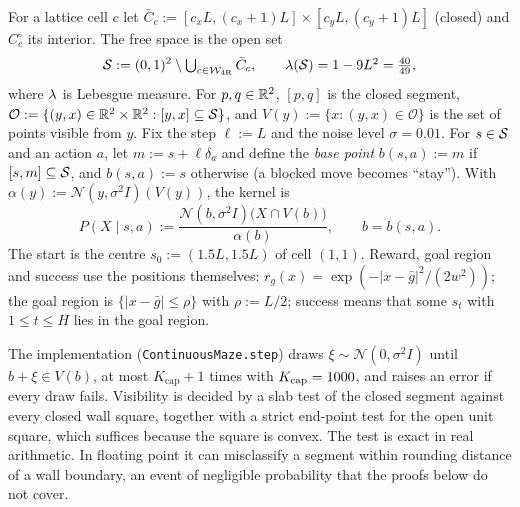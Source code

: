 \begin{definition}\label{def:env-cont}
For a lattice cell $c$ let $\bar C_c:=[c_xL,(c_x+1)L]\times[c_yL,(c_y+1)L]$ (closed) and $C^\circ_c$ its interior.
The free space is the open set
\[
\cS:=(0,1)^2\setminus\textstyle\bigcup_{c\in\cW_{\mathrm{4R}}}\bar C_c ,\qquad \Leb(\cS)=1-9L^2=\tfrac{40}{49},
\]
where $\Leb$ is Lebesgue measure.
For $p,q\in\R^2$, $[p,q]$ is the closed segment, $\mathcal O:=\{(y,x)\in\R^2\times\R^2:[y,x]\subseteq\cS\}$, and $V(y):=\{x:(y,x)\in\mathcal O\}$ is the set of points visible from $y$.
Fix the step $\ell:=L$ and the noise level $\sigma=0.01$.
For $s\in\cS$ and an action $a$, let $m:=s+\ell\delta_a$ and define the \emph{base point} $b(s,a):=m$ if $[s,m]\subseteq\cS$, and $b(s,a):=s$ otherwise (a blocked move becomes ``stay'').
With $\alpha(y):=\mathcal N(y,\sigma^2I)(V(y))$, the kernel is
\begin{equation}\label{eq:env-cont-kernel}
P(X\mid s,a):=\frac{\mathcal N(b,\sigma^2I)\big(X\cap V(b)\big)}{\alpha(b)},\qquad b=b(s,a).
\end{equation}
The start is the centre $s_0:=(1.5L,1.5L)$ of cell $(1,1)$.
Reward, goal region and success use the positions themselves: $r_g(x)=\exp(-\lvert x-\bar g\rvert^2/(2w^2))$; the goal region is $\{\lvert x-\bar g\rvert\le\rho\}$ with $\rho:=L/2$; success means that some $s_t$ with $1\le t\le H$ lies in the goal region.
\end{definition}

\noindent The implementation (\texttt{ContinuousMaze.step}) draws $\xi\sim\mathcal N(0,\sigma^2I)$ until $b+\xi\in V(b)$, at most $K_{\mathrm{cap}}+1$ times with $K_{\mathrm{cap}}=\vn{env.kcap}{1000}$, and raises an error if every draw fails.
Visibility is decided by a slab test of the closed segment against every closed wall square, together with a strict end-point test for the open unit square, which suffices because the square is convex.
The test is exact in real arithmetic. In floating point it can misclassify a segment within rounding distance of a wall boundary, an event of negligible probability that the proofs below do not cover.

